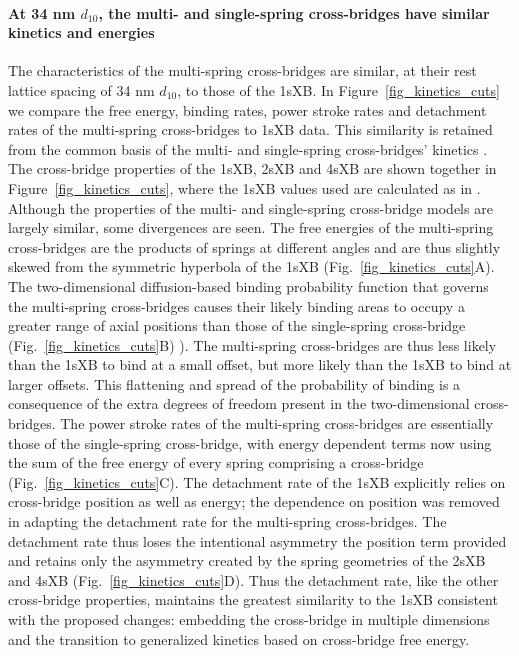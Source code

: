 \documentclass[]{article}
\begin{document}
\paragraph{At 34 nm $d_{10}$, the multi- and single-spring cross-bridges have similar kinetics and energies} %
The characteristics of the multi-spring cross-bridges are similar, at their rest lattice spacing of 34 nm $d_{10}$, to those of the 1sXB\@.
In Figure~\ref{fig_kinetics_cuts} we compare the free energy, binding rates, power stroke rates and detachment rates of the multi-spring cross-bridges to 1sXB data. 
This similarity is retained from the common basis of the multi- and single-spring cross-bridges' kinetics \citep{Pate1989}.
The cross-bridge properties of the 1sXB, 2sXB and 4sXB are shown together in Figure~\ref{fig_kinetics_cuts}, where the 1sXB values used are calculated as in \citet[Fig.~10]{Tanner2007}. 
Although the properties of the multi- and single-spring cross-bridge models are largely similar, some divergences are seen. 
The free energies of the multi-spring cross-bridges are the products of springs at different angles and are thus slightly skewed from the symmetric hyperbola of the 1sXB  (Fig.~\ref{fig_kinetics_cuts}A).
The two-dimensional diffusion-based binding probability function that governs the multi-spring cross-bridges causes their likely binding areas to occupy a greater range of axial positions than those of the single-spring cross-bridge (Fig.~\ref{fig_kinetics_cuts}B) \citep{BergBook, DillBook}).
The multi-spring cross-bridges are thus less likely than the 1sXB to bind at a small offset, but more likely than the 1sXB to bind at larger offsets. 
This flattening and spread of the probability of binding is a consequence of the extra degrees of freedom present in the two-dimensional cross-bridges. 
The power stroke rates of the multi-spring cross-bridges are essentially those of the single-spring cross-bridge, with energy dependent terms now using the  sum of the free energy of every spring comprising a cross-bridge  (Fig.~\ref{fig_kinetics_cuts}C). 
The detachment rate of the 1sXB explicitly relies on cross-bridge position as well as energy; the dependence on position was removed in adapting the detachment rate for the multi-spring cross-bridges. 
The detachment rate thus loses the intentional asymmetry the position term provided and retains only the asymmetry created by the spring geometries of the 2sXB and 4sXB (Fig.~\ref{fig_kinetics_cuts}D). 
Thus the detachment rate, like the other cross-bridge properties, maintains the greatest similarity to the 1sXB consistent with the proposed changes: embedding the cross-bridge in multiple dimensions and the transition to generalized kinetics based on cross-bridge free energy. 
\end{document}
